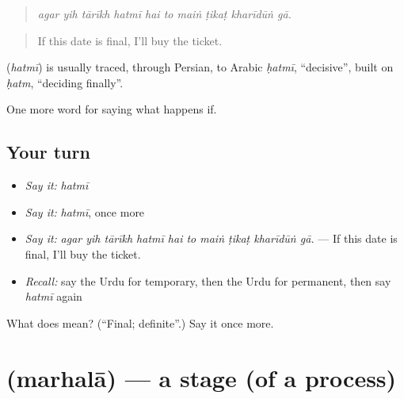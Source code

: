 \begin{quote}
         
\end{quote}

\begin{quote}
\emph{agar yih tārīkh hatmī hai to maiṅ ṭikaṭ kharīdūṅ gā.}
\end{quote}

\begin{quote}
If this date is final, I'll buy the ticket.
\end{quote}

\begin{cousinweb}
\textbf{} (\emph{hatmī}) is usually traced, through Persian, to Arabic \emph{ḥatmī}, \textquotedblleft{}decisive\textquotedblright{}, built on \emph{ḥatm}, \textquotedblleft{}deciding finally\textquotedblright{}.
\end{cousinweb}

\begin{grammarlens}[title={What you've built}]
One more word for saying what happens if.
\end{grammarlens}

\subsection*{Your turn}
\begin{itemize}
\raggedright
  \item \emph{Say it:} \emph{hatmī}
  \item \emph{Say it:} \emph{hatmī}, once more
  \item \emph{Say it:} \emph{agar yih tārīkh hatmī hai to maiṅ ṭikaṭ kharīdūṅ gā.} — If this date is final, I'll buy the ticket.
  \item \emph{Recall:} say the Urdu for temporary, then the Urdu for permanent, then say \emph{hatmī} again
\end{itemize}

\begin{tcolorbox}[breakable,colback=teal!4,colframe=teal!35!black,title={Before you move on}]
What does  mean? (\textquotedblleft{}Final; definite\textquotedblright{}.) Say it once more.
\end{tcolorbox}
\section[\texorpdfstring{\ur{مرحلہ} (marhalā)}{مرحلہ (marhalā)}]{ (marhalā) — a stage (of a process)}

